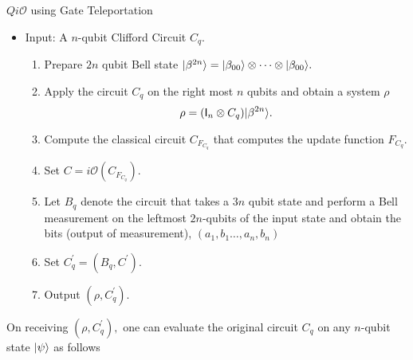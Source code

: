 \begin{algorithm}[H]
\label{QiO:Clifford-teleportation}
   \caption{$Qi\mathcal{O}$ using Gate Teleportation}
  \begin{itemize}
  \item Input: A $n$-qubit Clifford Circuit $C_q.$
  \begin{enumerate}
  \item Prepare $2n$ qubit Bell state ${\lvert}\beta^{ 2n}\rangle={\lvert}\beta_{00}\rangle\otimes \cdots \otimes {\lvert}\beta_{00}\rangle.$
  \item Apply the circuit $C_q$ on the right most $n$ qubits and obtain a system $\rho$
  										 $$\rho=({\sf I}_n\otimes C_q) {\lvert}\beta^{2n}\rangle.$$
 \item Compute the classical circuit $C_{F_{C_q}}$ that computes the update function $F_{C_q}.$	
 \item  Set $C=i\mathcal{O}(C_{F_{C_q}}).$							 
  \item Let $B_q$ denote the circuit that takes a $3n$ qubit state and perform a Bell measurement on the leftmost $2n$-qubits of the input state and obtain the bits (output of measurement), $(a_1,b_1\ldots,a_n,b_n)$ 
  \item Set $C_q^\prime=(B_q, C^\prime).$
  \item Output $\left(\rho,C_q^\prime \right).$
  \end{enumerate}
  \end{itemize}
\end{algorithm}

On receiving $\left(\rho,C_q^\prime \right),$ one can evaluate the original circuit $C_q$ on any $n$-qubit state ${\lvert}\psi\rangle$ as follows

